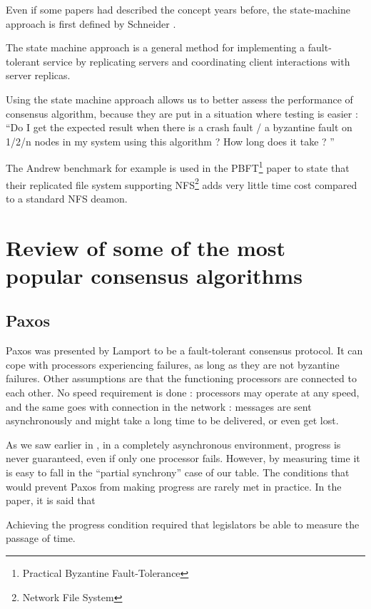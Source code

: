 \documentclass[11pt, twocolumn]{article}
\begin{document}
Even if some papers had described the concept years before, the state-machine approach is first defined by Schneider \cite{stateMachine}.

\begin{displayquote}
    The state machine approach is a general method for implementing a fault-tolerant service by replicating servers and coordinating client interactions with server replicas.
\end{displayquote}

Using the state machine approach allows us to better assess the performance of consensus algorithm, because they are put in a situation where testing is easier : “Do I get the expected result when there is a crash fault / a byzantine fault on 1/2/n nodes in my system using this algorithm ? How long does it take ? ”

The Andrew benchmark \cite{scaleperf} for example is used in the PBFT\footnote{Practical Byzantine Fault-Tolerance} paper \cite{pbft} to state that their replicated file system supporting NFS\footnote{Network File System} adds very little time cost compared to a standard NFS deamon.

\section{Review of some of the most popular consensus algorithms}
\subsection{Paxos}

Paxos was presented by Lamport \cite{parliament} to be a fault-tolerant consensus protocol. It can cope with processors experiencing failures, as long as they are not byzantine failures. Other assumptions are that the functioning processors are connected to each other. No speed requirement is done : processors may operate at any speed, and the same goes with connection in the network : messages are sent asynchronously and might take a long time to be delivered, or even get lost.

As we saw earlier in \cite{fischerlp}, in a completely asynchronous environment, progress is never guaranteed, even if only one processor fails. However, by measuring time it is easy to fall in the “partial synchrony” case of our table. The conditions that would prevent Paxos from making progress are rarely met in practice. In the paper, it is said that

\begin{displayquote}
    Achieving the progress condition required that legislators be able to measure the passage of time.
\end{displayquote}
\end{document}
